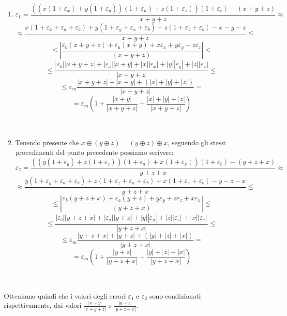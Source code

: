 \begin{enumerate}
    \item 
   		\[
    		\varepsilon_{1} = \frac{((x(1+\varepsilon_{x})+y(1+\varepsilon_{y}))(1+\varepsilon_{a})+z(1+\varepsilon_{z}))(1+\varepsilon_{b})-(x+y+z)}{x+y+z} \approx
    	\]
    	\[
    		\approx \frac{x(1+\varepsilon_{x}+\varepsilon_{a}+\varepsilon_{b})+y(1+\varepsilon_{y}+\varepsilon_{a}+\varepsilon_{b})+z(1+\varepsilon_{z}+\varepsilon_{b})-x-y-z}{x+y+z} \leq
    	\]
    	\[ 
    		\leq\left|\frac{\varepsilon_{b}(x+y+z)+\varepsilon_{a}(x+y)+x\varepsilon_{x}+y\varepsilon_{y}+z\varepsilon_{z}}{(x+y+z)}\right|\leq
    	\]
    	\[
    		\leq\frac{|\varepsilon_{b}||x+y+z|+|\varepsilon_{a}||x+y|+|x||\varepsilon_{x}|+|y||\varepsilon_{y}|+|z||\varepsilon_{z}|}{|x+y+z|}\leq
    	\]
    	\[
    		\leq\varepsilon_{m}\frac{|x+y+z|+|x+y|+(|x|+|y|+|z|)}{|x+y+z|}=
    	\]
    	\[
    		=\varepsilon_{m}\left(1+\frac{|x+y|}{|x+y+z|}+\frac{|x|+|y|+|z|}{|x+y+z|}\right)
    	\]\\\
    \item Tenendo presente che $x \oplus (y \oplus z) = (y \oplus z) \oplus x$, seguendo gli stessi procedimenti del punto precedente possiamo scrivere:\\
    	\[
    		\varepsilon_{2} = \frac{((y(1+\varepsilon_{y})+z(1+\varepsilon_{z}))(1+\varepsilon_{a})+x(1+\varepsilon_{x}))(1+\varepsilon_{b})-(y+z+x)}{y+z+x} \approx
    	\]
    	\[
    		\approx \frac{y(1+\varepsilon_{y}+\varepsilon_{a}+\varepsilon_{b})+z(1+\varepsilon_{z}+\varepsilon_{a}+\varepsilon_{b})+x(1+\varepsilon_{x}+\varepsilon_{b})-y-z-x}{y+z+x} \leq
    	\]
    	\[ 
    		\leq\left|\frac{\varepsilon_{b}(y+z+x)+\varepsilon_{a}(y+z)+y\varepsilon_{y}+z\varepsilon_{z}+x\varepsilon_{x}}{(y+z+x)}\right|\leq
    	\]
    	\[
    		\leq\frac{|\varepsilon_{b}||y+z+x|+|\varepsilon_{a}||y+z|+|y||\varepsilon_{y}|+|z||\varepsilon_{z}|+|x||\varepsilon_{x}|}{|y+z+x|}\leq
    	\]
    	\[
    		\leq\varepsilon_{m}\frac{|y+z+x|+|y+z|+(|y|+|z|+|x|)}{|y+z+x|}=
    	\]
    	\[
    		=\varepsilon_{m}\left(1+\frac{|y+z|}{|y+z+x|}+\frac{|y|+|z|+|x|}{|y+z+x|}\right)
    	\]\\\
\end{enumerate}
Otteniamo quindi che i valori degli errori $\varepsilon_{1}$ e $\varepsilon_{2}$ sono condizionati rispettivamente, dai valori $\frac{|x+y|}{|x+y+z|}$ e $\frac{|y+z|}{|y+z+x|}$.